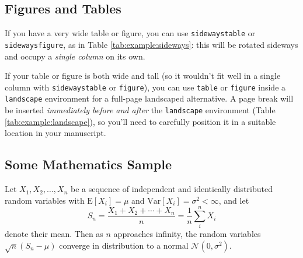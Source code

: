 \documentclass[a4paper,num-refs]{oup-contemporary}
\begin{document}
\subsection{Figures and Tables}
If you have a very wide table or figure, you can use \texttt{sidewaystable} or \texttt{sidewaysfigure}, as in Table \ref{tab:example:sideways}: this will be rotated sideways and occupy a \emph{single column} on its own.

If your table or figure is both wide and tall (so it wouldn't fit well in a single column with \texttt{sidewaystable} or \texttt{figure}), 
you can use \verb|table| or \verb|figure| inside a \verb|landscape| environment for a full-page landscaped alternative. A page break will be inserted \emph{immediately before and after} the \verb|landscape| environment (Table \ref{tab:example:landscape}), so you'll need to carefully position it in a suitable location in your manuscript.




\subsection{Some Mathematics Sample}

Let $X_1, X_2, \ldots, X_n$ be a sequence of independent and identically distributed random variables with $\text{E}[X_i] = \mu$ and $\text{Var}[X_i] = \sigma^2 < \infty$, and let
%
\begin{equation}
S_n = \frac{X_1 + X_2 + \cdots + X_n}{n}
      = \frac{1}{n}\sum_{i}^{n} X_i
\end{equation}
%
denote their mean. Then as $n$ approaches infinity, the random variables $\sqrt{n}(S_n - \mu)$ converge in distribution to a normal $\mathcal{N}(0, \sigma^2)$.
\end{document}
